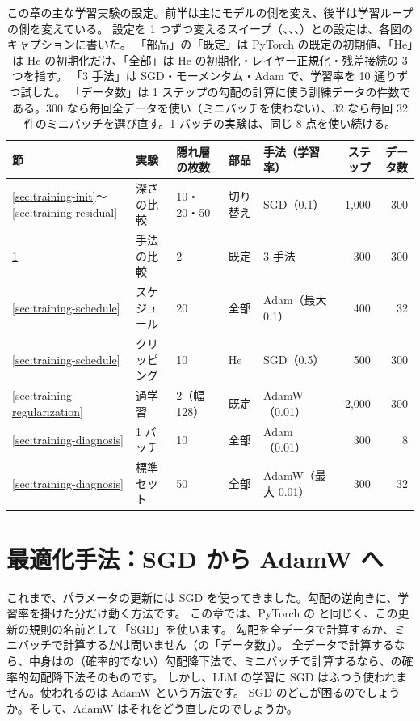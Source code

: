 \begin{table}[tbp]
\centering
\caption{この章の主な学習実験の設定。前半は主にモデルの側を変え、後半は学習ループの側を変えている。
設定を 1 つずつ変えるスイープ（、、、）との設定は、各図のキャプションに書いた。
「部品」の「既定」は PyTorch の既定の初期値、「He」は He の初期化だけ、「全部」は He の初期化・レイヤー正規化・残差接続の 3 つを指す。
「3 手法」は SGD・モーメンタム・Adam で、学習率を 10 通りずつ試した。
「データ数」は 1 ステップの勾配の計算に使う訓練データの件数である。300 なら毎回全データを使い（ミニバッチを使わない）、32 なら毎回 32 件のミニバッチを選び直す。1 バッチの実験は、同じ 8 点を使い続ける。}
\label{tab:training-experiments}
\small
\setlength{\tabcolsep}{4.5pt}
\begin{tabular}{lllllrr}
\toprule
節 & 実験 & 隠れ層の枚数 & 部品 & 手法（学習率） & ステップ & データ数 \\
\midrule
\ref{sec:training-init}〜\ref{sec:training-residual} & 深さの比較 & 10・20・50 & 切り替え & SGD（0.1） & 1,000 & 300 \\
\ref{sec:training-optim} & 手法の比較 & 2 & 既定 & 3 手法 & 300 & 300 \\
\ref{sec:training-schedule} & スケジュール & 20 & 全部 & Adam（最大 0.1） & 400 & 32 \\
\ref{sec:training-schedule} & クリッピング & 10 & He & SGD（0.5） & 500 & 300 \\
\ref{sec:training-regularization} & 過学習 & 2（幅 128） & 既定 & AdamW（0.01） & 2,000 & 300 \\
\ref{sec:training-diagnosis} & 1 バッチ & 10 & 全部 & Adam（0.01） & 300 & 8 \\
\ref{sec:training-diagnosis} & 標準セット & 50 & 全部 & AdamW（最大 0.01） & 300 & 32 \\
\bottomrule
\end{tabular}
\end{table}

\section{最適化手法：SGD から AdamW へ}\label{sec:training-optim}

これまで、パラメータの更新には SGD を使ってきました。勾配の逆向きに、学習率を掛けた分だけ動く方法です。
この章では、PyTorch の  と同じく、この更新の規則の名前として「SGD」を使います。
勾配を全データで計算するか、ミニバッチで計算するかは問いません（の「データ数」）。
全データで計算するなら、中身はの（確率的でない）勾配降下法で、ミニバッチで計算するなら、の確率的勾配降下法そのものです。
しかし、LLM の学習に SGD はふつう使われません。使われるのは AdamW という方法です。
SGD のどこが困るのでしょうか。そして、AdamW はそれをどう直したのでしょうか。

